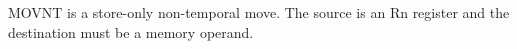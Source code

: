MOVNT is a store-only non-temporal move. The source is an Rn register and the destination must be a memory operand.
